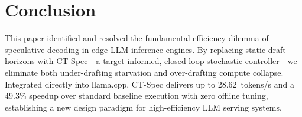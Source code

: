 \documentclass[journal,10pt,twocolumn]{IEEEtran}
\newcommand{\code}[1]{{\ttfamily\small #1}}
\newcommand{\ctspec}{\mbox{CT-Spec}}
\begin{document}
\section{Conclusion}
This paper identified and resolved the fundamental efficiency dilemma of speculative decoding in edge LLM inference engines. By replacing static draft horizons with \ctspec{}---a target-informed, closed-loop stochastic controller---we eliminate both under-drafting starvation and over-drafting compute collapse. Integrated directly into \code{llama.cpp}, \ctspec{} delivers up to 28.62~tokens/s and a 49.3\% speedup over standard baseline execution with zero offline tuning, establishing a new design paradigm for high-efficiency LLM serving systems.

%
\end{document}
